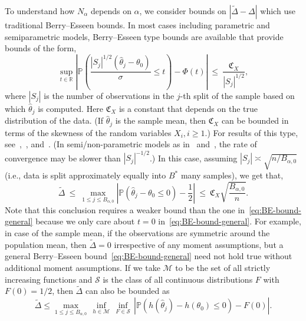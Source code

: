 \documentclass{article}
\numberwithin{myalgctr}{section}
\begin{document}
{\color{black}To understand how $N_{\alpha}$ depends on $\alpha$, we consider bounds on $|\widetilde{\Delta} - \Delta|$ which use traditional Berry--Esseen bounds.} In most cases including parametric and semiparametric models, Berry--Esseen type bounds are available that provide bounds of the form,
\begin{equation}\label{eq:BE-bound-general}
\sup_{t\in\mathbb{R}}\left|\mathbb{P}\left(\frac{|S_j|^{1/2}(\widehat{\theta}_j - \theta_0)}{\sigma} \le t\right) - \Phi(t)\right| ~\le~ \frac{\mathfrak{C}_X}{|S_j|^{1/2}},
\end{equation}
where $|S_j|$ is the number of observations in the $j$-th split of the sample based on which $\widehat{\theta}_j$ is computed. Here $\mathfrak{C}_X$ is a constant that depends on the true distribution of the data. (If $\widehat{\theta}_j$ is the sample mean, then $\mathfrak{C}_X$ can be bounded in terms of the skewness of the random variables $X_i, i\ge1$.) For results of this type, see~\cite{pfanzagl1971berry,pfanzagl1973accuracy},~\cite{bentkus1997berry,bentkus2005lyapunov}, and~\cite{pinelis2017optimal}. (In semi/non-parametric models as in~\cite{zhang2011berry} and~\cite{han2019berry}, the rate of convergence may be slower than $|S_j|^{-1/2}$.) In this case, assuming $|S_j| \asymp \sqrt{n/B_{\alpha,0}}$ (i.e., data is split approximately equally into $B^*$ many samples), we get that,
\begin{equation}\label{eq:BE-median-bias}
\widetilde{\Delta} ~\le~ \max_{1\le j\le B_{\alpha,0}}\left|\mathbb{P}(\widehat{\theta}_j - \theta_0 \le 0) - \frac{1}{2}\right| ~\le~ \mathfrak{C}_X\sqrt{\frac{B_{\alpha,0}}{n}}.
\end{equation}
Note that this conclusion requires a weaker bound than the one in~\eqref{eq:BE-bound-general} because we only care about $t = 0$ in~\eqref{eq:BE-bound-general}. For example, in case of the sample mean, if the observations are symmetric around the population mean, then $\widetilde{\Delta} = 0$ irrespective of any moment assumptions, but a general Berry--Esseen bound~\eqref{eq:BE-bound-general} need not hold true without additional moment assumptions. If we take $\mathcal{M}$ to be the set of all strictly increasing functions and $\mathcal{S}$ is the class of all continuous distributions $F$ with $F(0) = 1/2$, then $\widetilde{\Delta}$ can also be bounded as
\begin{equation}\label{eq:general-bound-median-bias}
\widetilde{\Delta} \le \max_{1\le j\le B_{\alpha,0}}\,\inf_{h\in\mathcal{M}}\,\inf_{F\in\mathcal{S}}\,\left|\mathbb{P}\left(h(\widehat{\theta}_j) - h(\theta_0) \le 0\right) - F(0)\right|.
\end{equation}
\end{document}
